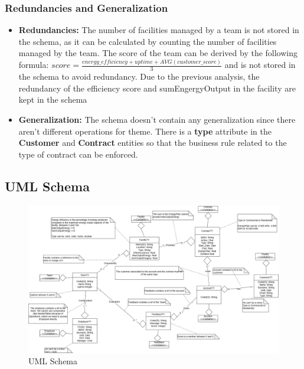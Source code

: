 \subsubsection{Redundancies and Generalization}
\begin{itemize}
    \item \textbf{Redundancies:} The number of facilities managed by a team is not stored in the schema, as it can be calculated by counting the number of facilities managed by the team. The score of the team can be derived by the following formula: $score = \frac{energy\_efficiency + uptime + AVG(customer\_score)}{3}$ and is not stored in the schema to avoid redundancy. Due to the previous analysis, the redundancy of the efficiency score and sumEngergyOutput in the facility are kept in the schema
    \item \textbf{Generalization:} The schema doesn't contain any generalization since there aren't different operations for theme. There is a \textbf{type} attribute in the \textbf{Customer} and \textbf{Contract} entities so that the business rule related to the type of contract can be enforced.
\end{itemize}


\subsection{UML Schema}

\begin{figure}[H]
    \centering
    \includegraphics[width=\textwidth]{images/UML.png}
    \caption{UML Schema}
\end{figure}

